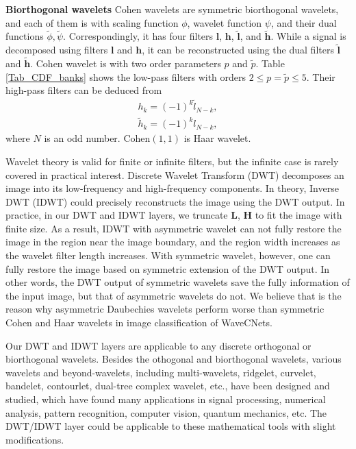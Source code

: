 \textbf{Biorthogonal wavelets}\label{APP_bior_wavelet}\quad
Cohen wavelets are symmetric biorthogonal wavelets,
and each of them is with scaling function $\phi$, wavelet function $\psi$, and their dual functions $\tilde{\phi}, \tilde{\psi}$.
Correspondingly, it has four filters $\textbf{l}$, $\textbf{h}$, $\tilde{\textbf{l}}$, and $\tilde{\textbf{h}}$.
While a signal is decomposed using filters $\textbf{l}$ and $\textbf{h}$,
it can be reconstructed using the dual filters $\tilde{\textbf{l}}$ and $\tilde{\textbf{h}}$.
Cohen wavelet is with two order parameters $p$ and $\tilde{p}$.
Table \ref{Tab_CDF_banks} shows the low-pass filters with orders $2\leq p = \tilde{p}\leq5$.
Their high-pass filters can be deduced from
\begin{eqnarray}\label{eq_high_pass_bank_bior}
&h_k = (-1)^k \tilde{l}_{N-k},&\\
&\tilde{h}_k = (-1)^k l_{N-k},&
\end{eqnarray}
where $N$ is an odd number.
Cohen$(1,1)$ is Haar wavelet.

Wavelet theory is valid for finite or infinite filters,
but the infinite case is rarely covered in practical interest.
Discrete Wavelet Transform (DWT) decomposes an image into its low-frequency and high-frequency components.
In theory, Inverse DWT (IDWT) could precisely reconstructs the image using the DWT output.
In practice, in our DWT and IDWT layers, we truncate \textbf{L}, \textbf{H} to fit the image with finite size.
As a result, IDWT with asymmetric wavelet can not fully restore the image in the region near the image boundary,
and the region width increases as the wavelet filter length increases.
With symmetric wavelet, however, one can fully restore the image based on symmetric extension of the DWT output.
In other words, the DWT output of symmetric wavelets save the fully information of the input image,
but that of asymmetric wavelets do not.
We believe that is the reason why asymmetric Daubechies wavelets perform worse
than symmetric Cohen and Haar wavelets in image classification of WaveCNets.

Our DWT and IDWT layers are applicable to any discrete orthogonal or biorthogonal wavelets.
Besides the othogonal and biorthogonal wavelets,
various wavelets and beyond-wavelets, including multi-wavelets, ridgelet, curvelet, bandelet, contourlet, dual-tree complex wavelet, etc.,
have been designed and studied, which have found many applications in signal processing, numerical analysis,
pattern recognition, computer vision, quantum mechanics, etc.
The DWT/IDWT layer could be applicable to these mathematical tools with slight modifications.

